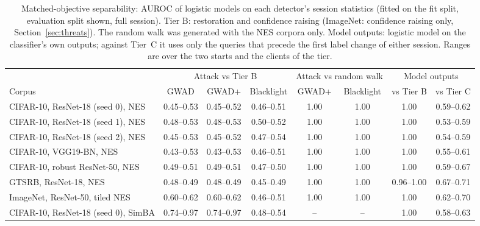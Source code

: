 \begin{table}[!tbp]
\centering\footnotesize\setlength{\tabcolsep}{4pt}
\caption{Matched-objective separability: AUROC of logistic models on each detector's session statistics (fitted on the fit split, evaluation split shown, full session). Tier B: restoration and confidence raising (ImageNet: confidence raising only, Section~\ref{sec:threats}). The random walk was generated with the NES corpora only. Model outputs: logistic model on the classifier's own outputs; against Tier~C it uses only the queries that precede the first label change of either session. Ranges are over the two starts and the clients of the tier.}
\label{tab:matched}
\vspace{3pt}
\begin{adjustbox}{max width=\textwidth}
\begin{tabular}{lccccccc}
\toprule
& \multicolumn{3}{c}{Attack vs Tier B} & \multicolumn{2}{c}{Attack vs random walk} & \multicolumn{2}{c}{Model outputs} \\
\cmidrule(lr){2-4}\cmidrule(lr){5-6}\cmidrule(lr){7-8}
Corpus & GWAD & GWAD+ & Blacklight & GWAD+ & Blacklight & vs Tier B & vs Tier C \\
\midrule
CIFAR-10, ResNet-18 (seed 0), NES & 0.45--0.53 & 0.45--0.52 & 0.46--0.51 & 1.00 & 1.00 & 1.00 & 0.59--0.62 \\
CIFAR-10, ResNet-18 (seed 1), NES & 0.48--0.53 & 0.48--0.53 & 0.50--0.52 & 1.00 & 1.00 & 1.00 & 0.53--0.59 \\
CIFAR-10, ResNet-18 (seed 2), NES & 0.45--0.53 & 0.45--0.52 & 0.47--0.54 & 1.00 & 1.00 & 1.00 & 0.54--0.59 \\
CIFAR-10, VGG19-BN, NES & 0.43--0.53 & 0.43--0.53 & 0.46--0.51 & 1.00 & 1.00 & 1.00 & 0.55--0.61 \\
CIFAR-10, robust ResNet-50, NES & 0.49--0.51 & 0.49--0.51 & 0.47--0.50 & 1.00 & 1.00 & 1.00 & 0.59--0.67 \\
GTSRB, ResNet-18, NES & 0.48--0.49 & 0.48--0.49 & 0.45--0.49 & 1.00 & 1.00 & 0.96--1.00 & 0.67--0.71 \\
ImageNet, ResNet-50, tiled NES & 0.60--0.62 & 0.60--0.62 & 0.46--0.51 & 1.00 & 1.00 & 1.00 & 0.62--0.70 \\
CIFAR-10, ResNet-18 (seed 0), SimBA & 0.74--0.97 & 0.74--0.97 & 0.48--0.54 & -- & -- & 1.00 & 0.58--0.63 \\
\bottomrule
\end{tabular}
\end{adjustbox}
\end{table}

